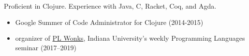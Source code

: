 \documentclass[10pt,a4paper]{article}
\begin{document}

\bodytext
  {
        Proficient in Clojure. Experience with Java, C, Racket, Coq, and Agda.
        }


\bodytext
  {
\begin{itemize}
  \item Google Summer of Code Administrator for Clojure (2014-2015)
  \item organizer of \href{http://wonks.github.io}{PL Wonks}, Indiana University's weekly Programming Languages seminar
    (2017--2019)
\end{itemize}
    }


%


\end{document}
